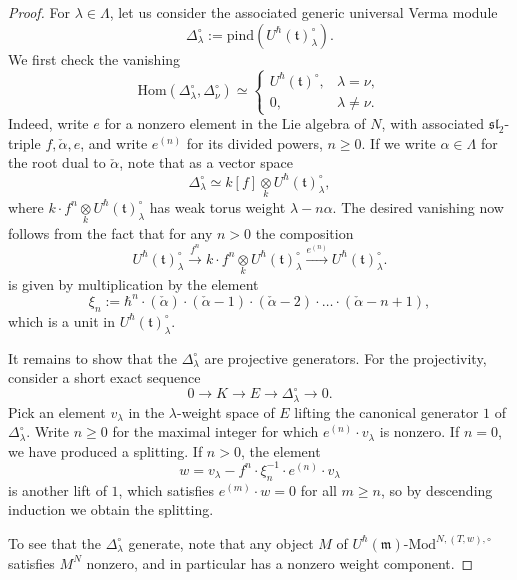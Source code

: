 \documentclass{amsart}
\theoremstyle{definition}
\newcommand{\fm}{\mathfrak{m}}
\newcommand{\halpha}{\check{\alpha}}
\newcommand{\ft}{\mathfrak{t}}
\newcommand{\Hom}{\on{Hom}}
\renewcommand{\mod}{\text{-}\on{Mod}}
\newcommand{\on}{\mathrm}
\numberwithin{equation}{section}
\begin{document}
\begin{proof} For $\lambda \in \Lambda$, let us consider the associated generic universal Verma module
$$\Delta_\lambda^\circ := \on{pind}(U^\hbar(\ft)^\circ_\lambda).$$We first check the vanishing 
$$\Hom(\Delta^\circ_\lambda, \Delta^\circ_\nu) \simeq \begin{cases} U^\hbar(\ft)^\circ, & \lambda = \nu,\\  0, & \lambda \neq \nu. \end{cases}$$
Indeed, write $e$ for a nonzero element in the Lie algebra of $N$, with associated $\mathfrak{sl}_2$-triple $f, \halpha, e$, and write $e^{(n)}$ for its divided powers, $n \geqslant 0$. If we write $\alpha \in \Lambda$ for the root dual to $\halpha$, note that as a vector space $$
\Delta^\circ_\lambda \simeq k[f] \underset{k} \otimes U^\hbar(\ft)^\circ_\lambda,$$
where $k \cdot f^n \underset{k} \otimes U^\hbar(\ft)^\circ_\lambda$ has weak torus weight $\lambda - n \alpha$. The desired vanishing now follows from the fact that for any $n > 0$ the composition 
$$U^\hbar(\ft)^\circ_\lambda \xrightarrow{f^n} k \cdot f^n \underset{k} \otimes U^\hbar(\ft)^\circ_\lambda \xrightarrow{e^{(n)}} U^\hbar(\ft)^\circ_\lambda.$$
is given by multiplication by the element 
$$\xi_n := \hbar^n \cdot (\halpha) \cdot (\halpha - 1) \cdot (\halpha - 2) \cdot \ldots \cdot (\halpha - n + 1),$$
which is a unit in $U^\hbar(\ft)^\circ_\lambda$. 

It remains to show that the $\Delta^\circ_\lambda$ are projective generators. For the projectivity, consider a short exact sequence 
$$0 \rightarrow K \rightarrow E \rightarrow \Delta^\circ_\lambda \rightarrow 0.$$
Pick an element $v_\lambda$ in the $\lambda$-weight space of $E$ lifting the canonical generator $1$ of $\Delta^\circ_\lambda$. Write $n \geqslant 0$ for the maximal integer for which $e^{(n)} \cdot v_\lambda$ is nonzero. If $n = 0$, we have produced a splitting. If $n > 0$, the element 
$$w = v_\lambda - f^n \cdot \xi_n^{-1} \cdot  e^{(n)} \cdot  v_\lambda$$
is another lift of $1$, which satisfies $e^{(m)} \cdot w = 0$ for all $m \geqslant n$, so by descending induction we obtain the splitting. 

To see that the $\Delta^\circ_\lambda$ generate, note that any object $M$ of $U^\hbar(\fm)\mod^{N, (T,w), \circ}$ satisfies $M^N$ nonzero, and in particular has a nonzero weight component. 
\end{proof}
\fi 
\end{document}
